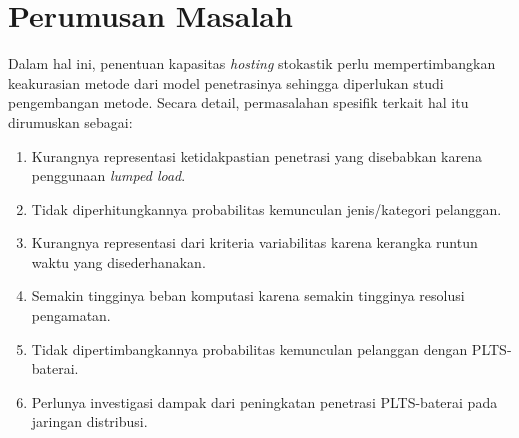 

\section{Perumusan Masalah}
Dalam hal ini, penentuan kapasitas \textit{hosting} stokastik perlu mempertimbangkan keakurasian metode dari model penetrasinya sehingga diperlukan studi pengembangan metode. Secara detail, permasalahan spesifik terkait hal itu dirumuskan sebagai:
\begin{enumerate}
\item Kurangnya representasi ketidakpastian penetrasi yang disebabkan karena penggunaan \textit{lumped load}.
\item Tidak diperhitungkannya probabilitas kemunculan jenis/kategori pelanggan.
\item Kurangnya representasi dari kriteria variabilitas karena kerangka runtun waktu yang disederhanakan.
\item Semakin tingginya beban komputasi karena semakin tingginya resolusi pengamatan.
\item Tidak dipertimbangkannya probabilitas kemunculan pelanggan dengan PLTS-baterai.
\item Perlunya investigasi dampak dari peningkatan penetrasi PLTS-baterai pada jaringan distribusi.
\end{enumerate}

